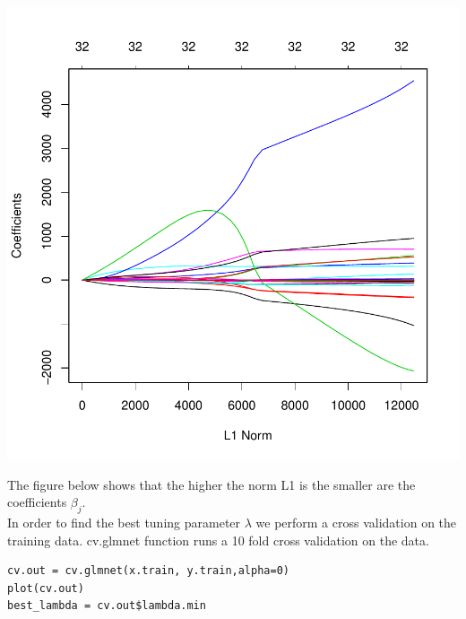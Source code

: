 \documentclass[]{report}
\begin{document}
\begin{center}
	\includegraphics{Figures/ridge_model.pdf}
\end{center}

The figure below shows that the higher the norm L1 is the smaller are the coefficients $\beta_{j}$.\\

In order to find the best tuning parameter $\lambda$ we perform a cross validation on the training data. cv.glmnet function runs a 10 fold cross validation on the data.

\begin{lstlisting}
cv.out = cv.glmnet(x.train, y.train,alpha=0)
plot(cv.out)
best_lambda = cv.out$lambda.min
\end{lstlisting}
\end{document}
